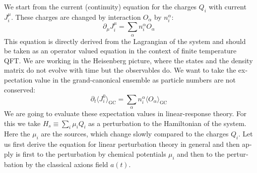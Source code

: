 \documentclass[master,       %
               twoside,        %
               BCOR10mm,       %
               english,ngerman, %
               ]{GAUBM}
\begin{document}
\begin{otherlanguage}{english}
We start from the current (continuity) equation for the charges $Q_i$ with current $J_i^\mu$. These charges are changed by interaction $O_\alpha$ by $n_i^\alpha$:
\begin{equation}
	\label{eq:current_eq}
	\partial_\mu J_i^\mu = \sum_\alpha n_i^\alpha O_\alpha
\end{equation}
This equation is directly derived from the Lagrangian of the system and should be taken as an operator valued equation in the context of finite temperature QFT. We are working in the Heisenberg picture, where the states and the density matrix do not evolve with time but the observables do.
We want to take the expectation value in the grand-canonical ensemble as particle numbers are not conserved:
\begin{equation}
	\label{eq:current_eq_expectation_value}
	\partial_t \langle J_i^0 \rangle_{\mathrm{GC}} = \sum_\alpha n_i^\alpha \langle O_\alpha \rangle_{\mathrm{GC}}
\end{equation}
We are going to evaluate these expectation values in linear-response theory.
For this we take $H_s \equiv \sum_i \mu_i Q_i$ as a perturbation to the Hamiltonian of the system.
Here the $\mu_i$ are the sources, which change slowly compared to the charges $Q_i$.
Let us first derive the equation for linear perturbation theory in general and then apply is first to the perturbation by chemical potentials $\mu_i$ and then to the perturbation by the classical axions field $a(t)$.


\end{otherlanguage}
\end{document}
